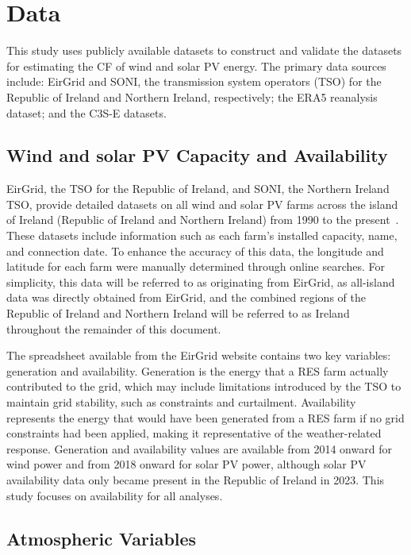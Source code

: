 \documentclass[preprint, 12pt]{elsarticle}
\begin{document}
\section{Data}
\label{sec:data}

This study uses publicly available datasets to construct and validate the datasets for estimating the CF of wind and solar PV energy. The primary data sources include: EirGrid and SONI, the transmission system operators (TSO) for the Republic of Ireland and Northern Ireland, respectively; the ERA5 reanalysis dataset; and the C3S-E datasets.

\subsection{Wind and solar PV Capacity and Availability}
\label{sec:eirgrid}

EirGrid, the TSO for the Republic of Ireland, and SONI, the Northern Ireland TSO, provide detailed datasets on all wind and solar PV farms across the island of Ireland (Republic of Ireland and Northern Ireland) from 1990 to the present~\citep{eirgrid2023spreadsheet}. These datasets include information such as each farm’s installed capacity, name, and connection date. To enhance the accuracy of this data, the longitude and latitude for each farm were manually determined through online searches. For simplicity, this data will be referred to as originating from EirGrid, as all-island data was directly obtained from EirGrid, and the combined regions of the Republic of Ireland and Northern Ireland will be referred to as Ireland throughout the remainder of this document.

The spreadsheet available from the EirGrid website contains two key variables: generation and availability. Generation is the energy that a RES farm actually contributed to the grid, which may include limitations introduced by the TSO to maintain grid stability, such as constraints and curtailment. Availability represents the energy that would have been generated from a RES farm if no grid constraints had been applied, making it representative of the weather-related response. Generation and availability values are available from 2014 onward for wind power and from 2018 onward for solar PV power, although solar PV availability data only became present in the Republic of Ireland in 2023. This study focuses on availability for all analyses.

\subsection{Atmospheric Variables}
\label{sec:era5}
\end{document}
